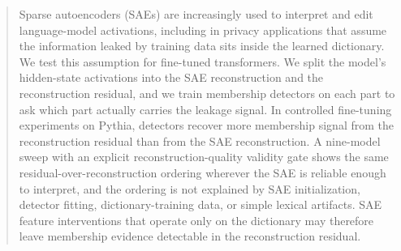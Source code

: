 \documentclass{article}
\theoremstyle{plain}
\theoremstyle{definition}
\theoremstyle{remark}
\begin{document}

\printAffiliationsAndNotice{}  %

\begin{abstract}
Sparse autoencoders (SAEs) are increasingly used to interpret and edit language-model activations, including in privacy applications that assume the information leaked by training data sits inside the learned dictionary. We test this assumption for fine-tuned transformers. We split the model's hidden-state activations into the SAE reconstruction and the reconstruction residual, and we train membership detectors on each part to ask which part actually carries the leakage signal. In controlled fine-tuning experiments on Pythia, detectors recover more membership signal from the reconstruction residual than from the SAE reconstruction. A nine-model sweep with an explicit reconstruction-quality validity gate shows the same residual-over-reconstruction ordering wherever the SAE is reliable enough to interpret, and the ordering is not explained by SAE initialization, detector fitting, dictionary-training data, or simple lexical artifacts. SAE feature interventions that operate only on the dictionary may therefore leave membership evidence detectable in the reconstruction residual.
\end{abstract}
\end{document}
